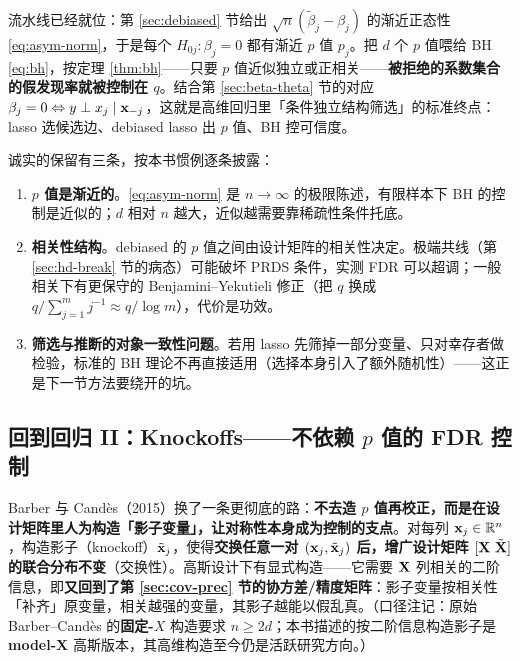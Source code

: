 流水线已经就位：第 \ref{sec:debiased} 节给出 $\sqrt{n}(\widetilde{\beta}_j - \beta_j)$ 的渐近正态性 \eqref{eq:asym-norm}，于是每个 $H_{0j}: \beta_j = 0$ 都有渐近 $p$ 值 $p_j$。把 $d$ 个 $p$ 值喂给 BH \eqref{eq:bh}，按定理 \ref{thm:bh}——只要 $p$ 值近似独立或正相关——\textbf{被拒绝的系数集合的假发现率就被控制在 $q$}。结合第 \ref{sec:beta-theta} 节的对应 $\beta_j = 0 \Leftrightarrow y \perp x_j \mid \mathbf{x}_{-j}$，这就是高维回归里「条件独立结构筛选」的标准终点：lasso 选候选边、debiased lasso 出 $p$ 值、BH 控可信度。

诚实的保留有三条，按本书惯例逐条披露：
\begin{enumerate}[label=(\roman*)]
  \item \textbf{$p$ 值是渐近的}。\eqref{eq:asym-norm} 是 $n \to \infty$ 的极限陈述，有限样本下 BH 的控制是近似的；$d$ 相对 $n$ 越大，近似越需要靠稀疏性条件托底。
  \item \textbf{相关性结构}。debiased 的 $p$ 值之间由设计矩阵的相关性决定。极端共线（第 \ref{sec:hd-break} 节的病态）可能破坏 PRDS 条件，实测 FDR 可以超调；一般相关下有更保守的 Benjamini--Yekutieli 修正\cite{benjamini2001}（把 $q$ 换成 $q / \sum_{j=1}^m j^{-1} \approx q / \log m$），代价是功效。
  \item \textbf{筛选与推断的对象一致性问题}。若用 lasso 先筛掉一部分变量、只对幸存者做检验，标准的 BH 理论不再直接适用（选择本身引入了额外随机性）——这正是下一节方法要绕开的坑。
\end{enumerate}

\subsection[回到回归 II：Knockoffs]{回到回归 II：Knockoffs——不依赖 $p$ 值的 FDR 控制}\label{sec:knockoffs}

Barber 与 Candès（2015）换了一条更彻底的路\cite{barber2015}：\textbf{不去造 $p$ 值再校正，而是在设计矩阵里人为构造「影子变量」，让对称性本身成为控制的支点}。对每列 $\mathbf{x}_j \in \mathbb{R}^n$，构造影子（knockoff）$\tilde{\mathbf{x}}_j$，使得\textbf{交换任意一对 $(\mathbf{x}_j, \tilde{\mathbf{x}}_j)$ 后，增广设计矩阵 $[\mathbf{X}\ \tilde{\mathbf{X}}]$ 的联合分布不变}（交换性）。高斯设计下有显式构造——它需要 $\mathbf{X}$ 列相关的二阶信息，即\textbf{又回到了第 \ref{sec:cov-prec} 节的协方差/精度矩阵}：影子变量按相关性「补齐」原变量，相关越强的变量，其影子越能以假乱真。（口径注记：原始 Barber--Candès 的\textbf{固定-$X$} 构造要求 $n \ge 2d$；本书描述的按二阶信息构造影子是 \textbf{model-X} 高斯版本，其高维构造至今仍是活跃研究方向。）

